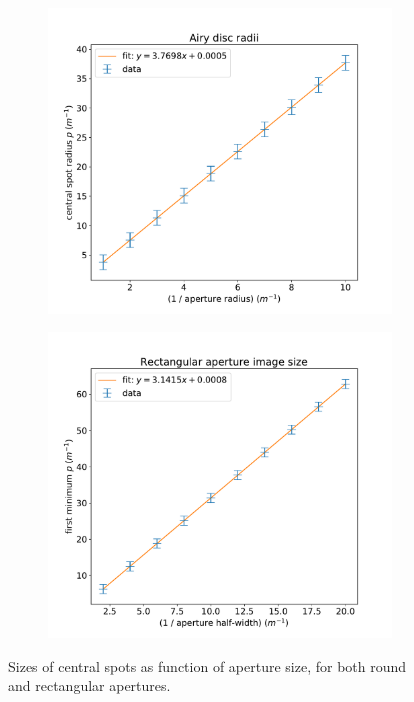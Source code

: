 \documentclass{article}
\begin{document}
\begin{figure}
    \centering
    \begin{subfigure}{0.5\textwidth}
        \centering
        \includegraphics[width=\textwidth]{pictures/tests/airy.pdf}
        \caption{}\label{fig:test1:round}
    \end{subfigure}%
    \begin{subfigure}{0.5\textwidth}
        \centering
        \includegraphics[width=\textwidth]{pictures/tests/rect.pdf}
        \caption{}\label{fig:test1:rect}
    \end{subfigure}
    \caption{Sizes of central spots as function of aperture size, for both round and rectangular apertures.}\label{fig:test1}
\end{figure}
\end{document}
